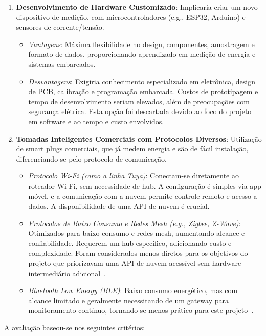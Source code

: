 \begin{enumerate}
    \item \textbf{Desenvolvimento de Hardware Customizado}: Implicaria criar um novo dispositivo de medição, com microcontroladores (e.g., ESP32, Arduino) e sensores de corrente/tensão.
    \begin{itemize}
        \item \textit{Vantagens}: Máxima flexibilidade no design, componentes, amostragem e formato de dados, proporcionando aprendizado em medição de energia e sistemas embarcados.
        \item \textit{Desvantagens}: Exigiria conhecimento especializado em eletrônica, design de PCB, calibração e programação embarcada. Custos de prototipagem e tempo de desenvolvimento seriam elevados, além de preocupações com segurança elétrica. Esta opção foi descartada devido ao foco do projeto em software e ao tempo e custo envolvidos.
    \end{itemize}

    \item \textbf{Tomadas Inteligentes Comerciais com Protocolos Diversos}: Utilização de smart plugs comerciais, que já medem energia e são de fácil instalação, diferenciando-se pelo protocolo de comunicação.
    \begin{itemize}
        \item \textit{Protocolo Wi-Fi (como a linha Tuya)}: Conectam-se diretamente ao roteador Wi-Fi, sem necessidade de hub. A configuração é simples via app móvel, e a comunicação com a nuvem permite controle remoto e acesso a dados. A disponibilidade de uma API de nuvem é crucial.
        \item \textit{Protocolos de Baixo Consumo e Redes Mesh (e.g., Zigbee, Z-Wave)}: Otimizados para baixo consumo e redes mesh, aumentando alcance e confiabilidade. Requerem um hub específico, adicionando custo e complexidade. Foram considerados menos diretos para os objetivos do projeto que priorizavam uma API de nuvem acessível sem hardware intermediário adicional~\cite{AlSarawi2017IoTProtocols}.
        \item \textit{Bluetooth Low Energy (BLE)}: Baixo consumo energético, mas com alcance limitado e geralmente necessitando de um gateway para monitoramento contínuo, tornando-se menos prático para este projeto~\cite{AlSarawi2017IoTProtocols}.
    \end{itemize}
\end{enumerate}

A avaliação baseou-se nos seguintes critérios:

